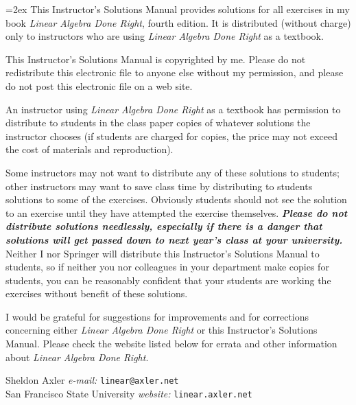 \documentclass[leqno,10pt]{book}
\begin{document}
{\raggedright \parskip=2ex
This Instructor's Solutions Manual provides solutions for all exercises in my book \textit{Linear Algebra Done Right}, fourth edition. It is distributed (without charge) only to instructors who are using \textit{Linear Algebra Done Right} as a textbook.

This Instructor's Solutions Manual is copyrighted by me. Please do not redistribute this electronic file to anyone else without my permission, and please do not post this electronic file on a web site.

\ignore
An instructor using \textit{Linear Algebra Done Right} as a textbook has permission to distribute to students in the class paper copies of whatever solutions the instructor chooses (if students are charged for copies, the price may not exceed the cost of materials and reproduction).

\ignore Some instructors may not want to distribute any of these solutions to students;
other instructors may want to save class time by distributing to students solutions to some of the exercises.  Obviously students
should not see the solution to an exercise until they have attempted the
exercise themselves.  \textit{\textbf{Please do not distribute solutions needlessly, especially if there is a danger that solutions will get passed down to next year's class at your university.}}  Neither I nor Springer will distribute this Instructor's Solutions Manual to students, so if neither you
nor colleagues in your department make copies for students, you can be
reasonably confident that your students are working the exercises without benefit
of these solutions.

I would be grateful for suggestions for improvements and for corrections concerning either \textit{Linear Algebra Done Right} or this Instructor's Solutions Manual.
Please check the website listed below for errata and other information about
\textit{Linear Algebra Done Right}.

\smallskip

{
\setlength{\parindent}{0bp}
Sheldon Axler \hfill \textsl{e-mail: }\texttt{linear@axler.net}\\
San Francisco State University \hfill \textsl{website: }\texttt{linear.axler.net}
}
}

\fi
\end{document}
